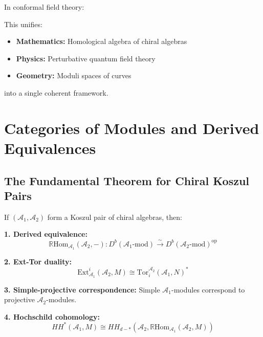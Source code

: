 In conformal field theory:
\begin{center}
\end{center}

This unifies:
\begin{itemize}
\item \textbf{Mathematics:} Homological algebra of chiral algebras
\item \textbf{Physics:} Perturbative quantum field theory
\item \textbf{Geometry:} Moduli spaces of curves
\end{itemize}

into a single coherent framework.


\section{Categories of Modules and Derived Equivalences}

\subsection{The Fundamental Theorem for Chiral Koszul Pairs}

\begin{theorem}
If $(\mathcal{A}_1, \mathcal{A}_2)$ form a Koszul pair of chiral algebras, then:

\textbf{1. Derived equivalence:}
$$\mathbb{R}\text{Hom}_{\mathcal{A}_1}(\mathcal{A}_2, -): D^b(\mathcal{A}_1\text{-mod}) \xrightarrow{\sim} D^b(\mathcal{A}_2\text{-mod})^{\text{op}}$$

\textbf{2. Ext-Tor duality:}
$$\text{Ext}^i_{\mathcal{A}_1}(\mathcal{A}_2, M) \cong \text{Tor}_i^{\mathcal{A}_2}(\mathcal{A}_1, N)^*$$

\textbf{3. Simple-projective correspondence:}
Simple $\mathcal{A}_1$-modules correspond to projective $\mathcal{A}_2$-modules.

\textbf{4. Hochschild cohomology:}
$$HH^*(\mathcal{A}_1, M) \cong HH_{d-*}(\mathcal{A}_2, \mathbb{R}\text{Hom}_{\mathcal{A}_1}(\mathcal{A}_2, M))$$
\end{theorem}

